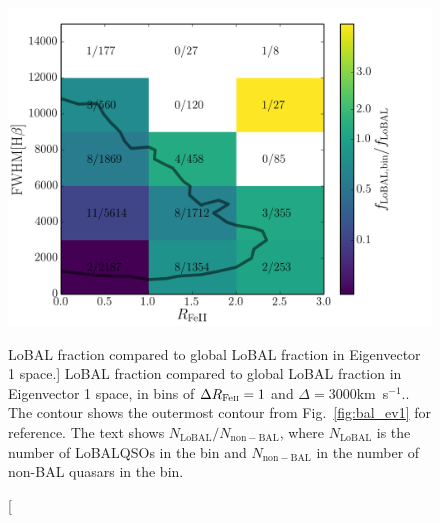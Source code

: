 \begin{figure}
\centering
\includegraphics[width=1.0\textwidth]{figures/ewpaper/ev1_bins.png}
\caption
[LoBAL fraction compared to global LoBAL fraction in Eigenvector 1 space.]
{
LoBAL fraction compared to global LoBAL fraction in Eigenvector 1 space, in bins
of $\Delta R_{{\rm Fe \textsc{ii}}} = 1$ and $\Delta$\fwh$=3000$km~s$^{-1}$..
The contour shows the outermost contour from Fig.~\ref{fig:bal_ev1} for
reference. The text shows $N_{\mathrm{LoBAL}}/N_{\mathrm{non-BAL}}$, 
where $N_{\mathrm{LoBAL}}$ is the number of LoBALQSOs in the bin and 
$N_{\mathrm{non-BAL}}$ in the number of non-BAL quasars in the bin.
}
\label{fig:bal_ev1_bins}
\end{figure}





